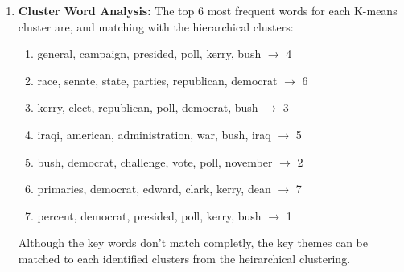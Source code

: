 \documentclass{article}
\begin{document}
\begin{enumerate}[label=\alph*.]
\begin{enumerate}[label=(\roman*)]
                  \item \textbf{Cluster Word Analysis:} The top 6 most frequent words for each K-means cluster are, and matching with the hierarchical clusters:
                        \begin{enumerate}[label=\arabic*/]
                              \item general, campaign, presided, poll, kerry, bush $\to$ 4
                              \item race, senate, state, parties, republican, democrat $\to$ 6
                              \item kerry, elect, republican, poll, democrat, bush $\to$ 3
                              \item iraqi, american, administration, war, bush, iraq $\to$ 5
                              \item bush, democrat, challenge, vote, poll, november $\to$ 2
                              \item primaries, democrat, edward, clark, kerry, dean $\to$ 7
                              \item percent, democrat, presided, poll, kerry, bush $\to$ 1
                        \end{enumerate}
                        Although the key words don't match completly, the key themes can be matched to each identified clusters from the heirarchical clustering.

            \end{enumerate}

\end{enumerate}
\end{document}
